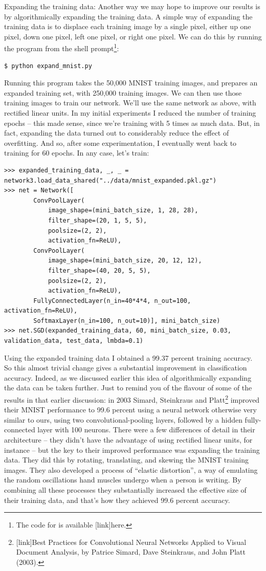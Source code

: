 \documentclass[a4paper,twoside,10pt]{book}
\begin{document}
Expanding the training data: Another way we may hope to improve our results is by algorithmically expanding the training data. A simple way of expanding the training data is to displace each training image by a single pixel, either up one pixel, down one pixel, left one pixel, or right one pixel. We can do this by running the program  from the shell prompt\footnote{The code for  is available [link]here.}:
\begin{lstlisting}
$ python expand_mnist.py
\end{lstlisting}
Running this program takes the 50,000 MNIST training images, and prepares an expanded training set, with 250,000 training images. We can then use those training images to train our network. We'll use the same network as above, with rectified linear units. In my initial experiments I reduced the number of training epochs -- this made sense, since we're training with 5 times as much data. But, in fact, expanding the data turned out to considerably reduce the effect of overfitting. And so, after some experimentation, I eventually went back to training for 60 epochs. In any case, let's train:

\begin{lstlisting}
>>> expanded_training_data, _, _ = network3.load_data_shared("../data/mnist_expanded.pkl.gz")
>>> net = Network([
		ConvPoolLayer(
			image_shape=(mini_batch_size, 1, 28, 28),
			filter_shape=(20, 1, 5, 5), 
			poolsize=(2, 2), 
			activation_fn=ReLU),
		ConvPoolLayer(
			image_shape=(mini_batch_size, 20, 12, 12),
			filter_shape=(40, 20, 5, 5), 
			poolsize=(2, 2),
			activation_fn=ReLU),
		FullyConnectedLayer(n_in=40*4*4, n_out=100, activation_fn=ReLU),
		SoftmaxLayer(n_in=100, n_out=10)], mini_batch_size)
>>> net.SGD(expanded_training_data, 60, mini_batch_size, 0.03, validation_data, test_data, lmbda=0.1)
\end{lstlisting}
Using the expanded training data I obtained a 99.37 percent training accuracy. So this almost trivial change gives a substantial improvement in classification accuracy. Indeed, as we discussed earlier this idea of algorithmically expanding the data can be taken further. Just to remind you of the flavour of some of the results in that earlier discussion: in 2003 Simard, Steinkraus and Platt\footnote{[link]Best Practices for Convolutional Neural Networks Applied to Visual Document Analysis, by Patrice Simard, Dave Steinkraus, and John Platt (2003).} improved their MNIST performance to 99.6 percent using a neural network otherwise very similar to ours, using two convolutional-pooling layers, followed by a hidden fully-connected layer with 100 neurons. There were a few differences of detail in their architecture -- they didn't have the advantage of using rectified linear units, for instance -- but the key to their improved performance was expanding the training data. They did this by rotating, translating, and skewing the MNIST training images. They also developed a process of ``elastic distortion'', a way of emulating the random oscillations hand muscles undergo when a person is writing. By combining all these processes they substantially increased the effective size of their training data, and that's how they achieved 99.6 percent accuracy.
\end{document}
